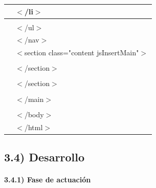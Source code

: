 \documentclass{article} %
\begin{document}
\begin{tabular}{|p{0.6in}|p{4.0in}|}
 &      $\mathrm{<}$/li$\mathrm{>}$ \\ \hline 
 &       \\ \hline 
 &     $\mathrm{<}$/ul$\mathrm{>}$ \\ \hline 
 &    $\mathrm{<}$/nav$\mathrm{>}$ \\ \hline 
 &    $\mathrm{<}$section class="content jsInsertMain"$\mathrm{>}$ \\ \hline 
 &      \\ \hline 
 &    $\mathrm{<}$/section$\mathrm{>}$ \\ \hline 
 & \newline  \\ \hline 
 &   $\mathrm{<}$/section$\mathrm{>}$ \\ \hline 
 &    \\ \hline 
 &  $\mathrm{<}$/main$\mathrm{>}$ \\ \hline 
 &   \\ \hline 
 & $\mathrm{<}$/body$\mathrm{>}$ \\ \hline 
 & $\mathrm{<}$/html$\mathrm{>}$ \\ \hline 
\end{tabular}



\noindent 

\noindent 

\noindent 

\noindent 

\noindent 

\noindent 

\noindent 


\subsection{3.4) Desarrollo}


\paragraph{       3.4.1) Fase de actuaci\'{o}n }
\end{document}

